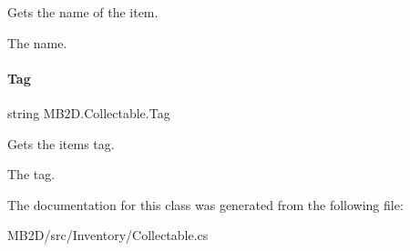 Gets the name of the item. 

The name.\hypertarget{class_m_b2_d_1_1_collectable_a97f42790fdafd06634b87cd4023bc0fe}{}\label{class_m_b2_d_1_1_collectable_a97f42790fdafd06634b87cd4023bc0fe} 
\paragraph{\texorpdfstring{Tag}{Tag}}
{\footnotesize\ttfamily string M\+B2\+D.\+Collectable.\+Tag\hspace{0.3cm}{\ttfamily [get]}}



Gets the items tag. 

The tag.

The documentation for this class was generated from the following file\+:\begin{DoxyCompactItemize}
\item 
M\+B2\+D/src/\+Inventory/Collectable.\+cs\end{DoxyCompactItemize}
